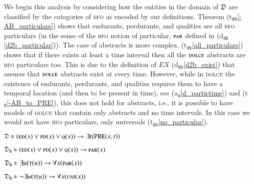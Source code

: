 \documentclass[ao]{iosart2x}
\newcommand{\nb}[1]{\textcolor{red}{$|$}\marginpar{\hspace*{-0cm}\parbox{20mm}{\scriptsize\raggedright\textcolor{red}{#1}}}}
\newcommand{\bflist}{\begin{list}{}{\setlength{\topsep}{2mm}\setlength{\parsep}{0mm}\setlength{\leftmargin}{9.2mm}\setlength{\labelwidth}{8mm}}}
\newcommand{\eflist}{\end{list}}
\newcommand{\dolceAxLabel}{\textrm{a$_\texttt{d}$}}
\newcommand{\dolceAxLabelscript}{\scriptsize \textrm{a$_\texttt{d}$}}
\newcommand{\dolceThrLabel}{\textrm{t$_\texttt{d}$}}
\newcommand{\dbDefLabel}{\textrm{d$_\texttt{db}$}}
\newcommand{\dbThrLabel}{\textrm{t$_\texttt{db}$}}
\newcounter{cntax}
\newcommand{\dolceax}[1]{\refstepcounter{cntax}\begin{small}{\bf \dolceAxLabelscript\thecntax\label{#1}}\end{small}}
\newcounter{cntthr}
\newcommand{\dolceth}[1]{\refstepcounter{cntthr}\begin{small}{\bf \dolceThrLabel\thecntthr\label{#1}}\end{small}}
\newcounter{cntdbth}
\newcommand{\dbth}[1]{\refstepcounter{cntdbth}\begin{small}{\bf \dbThrLabel\thecntdbth\label{#1}}\end{small}}
\newcommand{\refdolceax}[1]{({\dolceAxLabel}\ref{#1})}
\newcommand{\refdolceth}[1]{({\dolceThrLabel}\ref{#1})}
\newcommand{\refdbdf}[1]{({\dbDefLabel}\ref{#1})}
\newcommand{\refdbth}[1]{({\dbThrLabel}\ref{#1})}
\newcommand{\pr}[1]{\mathtt{#1}}
\newcommand{\prbfo}[1]{{\textit{{#1}}}}
\newcommand{\dolce}{{\textsc{dolce}}}
\newcommand{\bfo}{{\textsc{bfo}}}
\newcommand {\thdolce} {\ensuremath{\mathfrak{D}}}
\newcommand {\thdolcedbmap} {\ensuremath{\mathfrak{D}_\texttt{b}}}
\newcommand {\EDdcat} {\textsc{ed}}
\newcommand {\PDdcat} {\textsc{pd}}
\newcommand {\Qdcat} {\textsc{q}}
\newcommand {\Tdcat} {\textsc{t}}
\newcommand {\PREd} {\ensuremath{\pr{PRE}}}
\newcommand {\TLCd} {\ensuremath{\pr{TLC}}}
\newcommand{\bfopartic}{\textsc{par}}
\newcommand{\bfouniv}{\textsc{uni}}
\newcommand{\bfoexist}{\prbfo{EX}}
\begin{document}
We begin this analysis by considering how the entities in the domain of $\thdolce$ are classified  by the categories of {\bfo} as encoded by our definitions. %
Theorem \refdbth{-AB_particulars} shows that endurants, perdurants, and qualities are all {\bfo} particulars (in the sense of the {\bfo} notion of particular, $\bfopartic$ defined in \refdbdf{d2b_particular}). The case of  abstracts is more complex. \refdbth{all_particulars} shows that if there exists at least a time interval then all the $\dolce$ abstracts are {\bfo} particulars too. This is due to the definition of $\bfoexist$ \refdbdf{d2b_exist} that assures that $\dolce$ abstracts exist at every time. However, while in {\dolce} the existence of endurants, perdurants, and qualities requires them to have a temporal location (and then to be present in time), see \refdolceax{d_partictime} and \refdolceth{-AB_to_PRE}, this does not hold for abstracts, i.e., it is possible to have models of {\dolce} that contain only abstracts and no time intervals. In this case we would not have {\bfo} particulars, only universals \refdbth{no_particular}.

\bflist

\item[\dolceth{-AB_to_PRE}] $\thdolce \vDash (\EDdcat(x) \lor \PDdcat(x) \lor \Qdcat(x)) \to \exists t(\PREd(x,t))$

\item[\dbth{-AB_particulars}] $\thdolcedbmap \vDash (\EDdcat(x) \lor \PDdcat(x) \lor \Qdcat(x)) \to \bfopartic(x)$

\item[\dbth{all_particulars}] $\thdolcedbmap \vDash \exists u(\Tdcat(u)) \to \forall x(\bfopartic(x))$

\item[\dbth{no_particular}] $\thdolcedbmap \vDash \neg\exists u(\Tdcat(u)) \to \forall x(\bfouniv(x))$

\eflist
\end{document}
